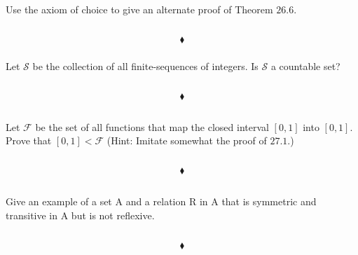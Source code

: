 \renewcommand{\thesubsection}{\thesection.\RomanNumeralCaps{11}}
\subsection{}
\subsubsection{}
\begin{tcolorbox}
Use the axiom of choice to give an alternate proof of Theorem $\mathbf{26.6}$. 

\end{tcolorbox}
$$ $$

$$\blacklozenge$$

\subsubsection{}
\begin{tcolorbox}
Let $\mathscr{S}$ be the collection of all finite-sequences of integers. Is $\mathscr{S}$ a countable set? 
\end{tcolorbox}
$$ $$

$$\blacklozenge$$


\renewcommand{\thesubsection}{\thesection.\RomanNumeralCaps{12}}
\subsection{}
\begin{tcolorbox}
Let $\mathscr{F}$ be the set of all functions that map the closed interval $[0, 1]$ into $[0, 1]$. Prove that $[0,1] < \mathscr{F}$ (Hint: Imitate somewhat the proof of $\mathbf{27.1}$.) 
\end{tcolorbox}
$$ $$

$$\blacklozenge$$

\renewcommand{\thesubsection}{\thesection.\RomanNumeralCaps{13}}
\subsection{}
\subsubsection{}
\begin{tcolorbox}
Give an example of a set A and a relation R in A that is symmetric and transitive in A but is not reflexive. 
\end{tcolorbox}
$$ $$

$$\blacklozenge$$


